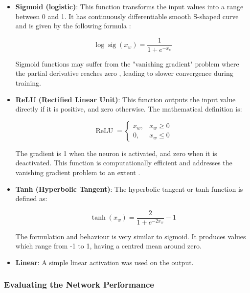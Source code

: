 \begin{itemize}
	\item \textbf{Sigmoid (logistic)}: This function transforms the input values into a range between 0 and 1. It has continuously differentiable smooth S-shaped curve and is given by the following formula \cite{Han1995}:
	
	\begin{equation}\label{Logistic sigmoid}
		\log \operatorname{sig}(x_w)=\frac{1}{1+e^{-x_w}}
	\end{equation} 
	
	Sigmoid functions may suffer from the "vanishing gradient" problem where the partial derivative reaches zero \cite{Sharma2020}, leading to slower convergence during training.
	
	\item \textbf{ReLU (Rectified Linear Unit)}: This function outputs the input value directly if it is positive, and zero otherwise. The mathematical definition is:
	
	\begin{equation}\label{ReLU}
		\operatorname{ReLU}= \begin{cases}x_w, & x_w \geq 0 \\ 0, & x_w \leq 0\end{cases}
	\end{equation}
	
	The gradient is 1 when the neuron is activated, and zero when it is deactivated. This function is computationally efficient and addresses the vanishing gradient problem to an extent \cite{Sharma2020}.
	
	\item \textbf{Tanh (Hyperbolic Tangent)}: The hyperbolic tangent or tanh function is defined as:
	
	\begin{equation}\label{Hyperbolic tangent}
		\tanh (x_w)=\frac{2}{1+e^{-2 x_w}}-1
	\end{equation}
	
	The formulation and behaviour is very similar to sigmoid. It produces values which range from -1 to 1, having a centred mean around zero.
	
	\item \textbf{Linear}: A simple linear activation was used on the output.
	
\end{itemize}

\subsubsection{Evaluating the Network Performance}

